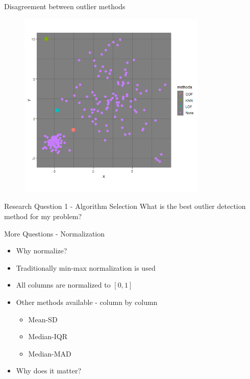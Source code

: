 \documentclass{beamer}
\begin{document}
\begin{darkframes}
\begin{frame}{Disagreement between outlier methods}
       \begin{figure}
    \captionsetup[subfigure]{labelformat=empty}
     \centering
		\includegraphics[width=0.8\textwidth]{example3.png}
	\end{figure}
\end{frame}

\begin{frame}{Research Question 1 - Algorithm Selection}
    \centering
    {\huge What is the best outlier detection } \\ \vspace{0.5cm}
    {\huge method for my problem?}
\end{frame}	

	\begin{frame}{More Questions - Normalization}
	\begin{itemize}
		\item Why normalize?
		\item Traditionally min-max normalization is used
		\item All columns are normalized to $[0, 1]$
		\item Other methods available - column by column
		\begin{itemize}
			\item Mean-SD
			\item Median-IQR
			\item Median-MAD
		\end{itemize}
		\vspace{1cm}		
		\item { \Large Why does it matter? }
		\end{itemize}
	\end{frame}


\end{darkframes}
\end{document}
